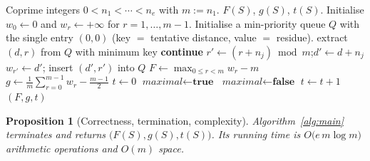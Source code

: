 \documentclass{amsart}
\newtheorem{proposition}{Proposition}
\theoremstyle{definition}
\begin{document}
\begin{algorithm}[ht]
\caption{Ap\'ery vector and invariants of $\langle n_1,\dots,n_e\rangle$}
\label{alg:main}
\begin{algorithmic}[1]
\Require Coprime integers $0<n_1<\cdots<n_e$ with $m:=n_1$.
\Ensure $F(S)$, $g(S)$, $t(S)$.
\State Initialise $w_0\gets0$ and $w_r\gets+\infty$ for $r=1,\dots,m-1$.
\State Initialise a min-priority queue $Q$ with the single entry $(0,0)$
(key $=$ tentative distance, value $=$ residue).
  \State extract $(d,r)$ from $Q$ with minimum key
   \State \textbf{continue} \EndIf
    \State $r'\gets (r+n_j)\bmod m$;\quad $d'\gets d+n_j$
      \State $w_{r'}\gets d'$; insert $(d',r')$ into $Q$
    \EndIf
  \EndFor
\EndWhile
\State $F\gets \max_{0\le r<m} w_r-m$
\State $g\gets \tfrac1m\sum_{r=0}^{m-1}w_r-\tfrac{m-1}{2}$
\State $t\gets 0$
  \State $\textit{maximal}\gets\textbf{true}$
     \State $\textit{maximal}\gets
    \textbf{false}$ \EndIf
  \EndFor
   \State $t\gets t+1$ \EndIf
\EndFor
\State \Return $(F,g,t)$
\end{algorithmic}
\end{algorithm}

\begin{proposition}[Correctness, termination, complexity]\label{prop:alg}
Algorithm~\ref{alg:main} terminates and returns
$\bigl(F(S),g(S),t(S)\bigr)$. Its running time is
$O\!\bigl(e\,m\log m\bigr)$ arithmetic operations and $O(m)$ space.
\end{proposition}
\end{document}
